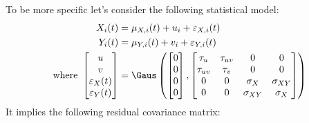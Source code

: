 \documentclass[12pt]{article}
\begin{document}
\bigskip

To be more specific let's consider the following statistical model:
\begin{align*}
X_i(t) &= \mu_{X,i}(t) + u_i + \varepsilon_{X,i}(t) \\
Y_i(t) &= \mu_{Y,i}(t) + v_i + \varepsilon_{Y,i}(t) \\
\text{where } \begin{bmatrix}u \\ v \\ \varepsilon_X(t) \\ \varepsilon_Y(t) \end{bmatrix}
&= \Gaus\left(\begin{bmatrix}0 \\ 0 \\ 0 \\ 0 \end{bmatrix},
\begin{bmatrix}
\tau_u & \tau_{uv} & 0 & 0 \\ \tau_{uv} & \tau_v & 0 & 0 \\ 
 0 & 0 & \sigma_X & \sigma_{XY} \\ 0 & 0 & \sigma_{XY} & \sigma_X \\ 
\end{bmatrix} \right)
\end{align*}
It implies the following residual covariance matrix:
\end{document}

